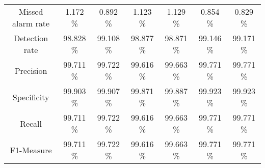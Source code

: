 \begin{table}[htb]
\begin{tabular}{@{}ccccccc@{}}
        Missed alarm rate &  1.172 \% &  0.892 \% &  1.123 \% &  1.129 \% &  0.854 \% &  0.829 \% \\
        Detection rate &  98.828 \% &  99.108 \% &  98.877 \% &  98.871 \% &  99.146 \% &  99.171 \% \\
        Precision &  99.711 \% &  99.722 \% &  99.616 \% &  99.663 \% &  99.771 \% &  99.771 \% \\
        Specificity &  99.903 \% &  99.907 \% &  99.871 \% &  99.887 \% &  99.923 \% &  99.923 \% \\
        Recall &  99.711 \% &  99.722 \% &  99.616 \% &  99.663 \% &  99.771 \% &  99.771 \% \\
        F1-Measure &  99.711 \% &  99.722 \% &  99.616 \% &  99.663 \% &  99.771 \% &  99.771 \% \\
        \bottomrule
    \end{tabular}
\end{table}